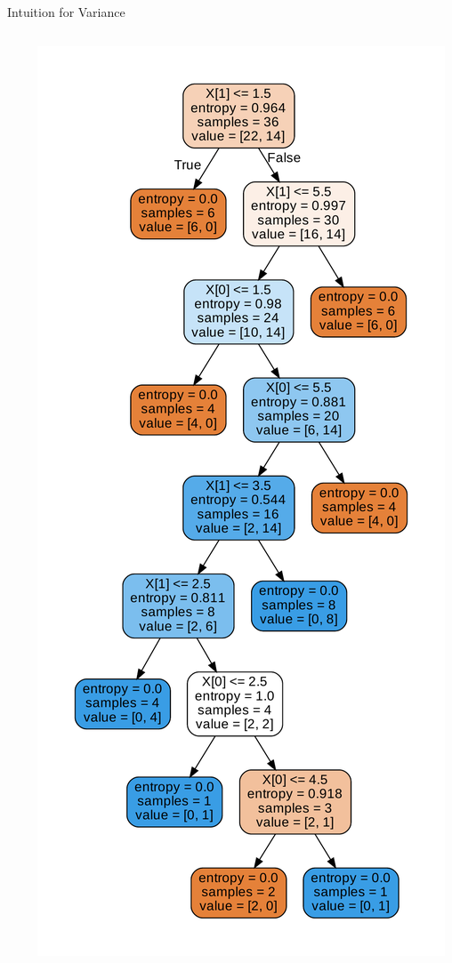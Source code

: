 \documentclass{beamer}
\begin{document}
\begin{frame}{Intuition for Variance}
\begin{columns}
\begin{column}{0.5\textwidth}
\begin{center}
			\end{center}
		\end{column}
		\begin{column}{0.5\textwidth}
			\begin{center}
			\includegraphics[scale=0.2]{var_2}
			\end{center}
		\end{column}
	\end{columns}
	\end{frame}
\end{document}
